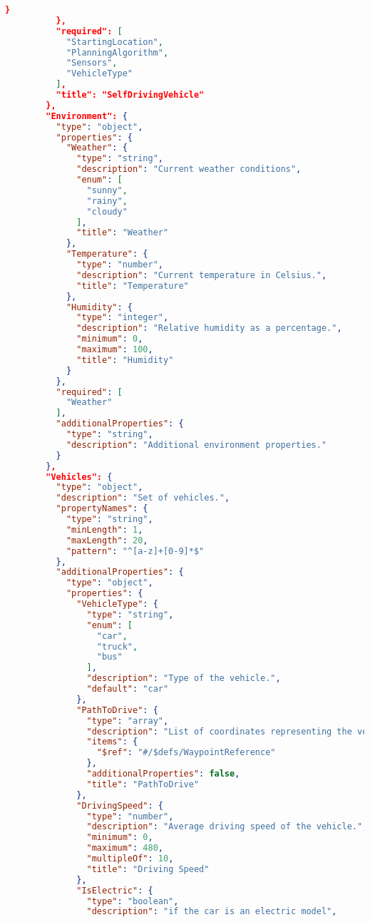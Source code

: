 \begin{lstlisting}[language=json,firstnumber=1]
            }
          },
          "required": [
            "StartingLocation",
            "PlanningAlgorithm",
            "Sensors",
            "VehicleType"
          ],
          "title": "SelfDrivingVehicle"
        },
        "Environment": {
          "type": "object",
          "properties": {
            "Weather": {
              "type": "string",
              "description": "Current weather conditions",
              "enum": [
                "sunny",
                "rainy",
                "cloudy"
              ],
              "title": "Weather"
            },
            "Temperature": {
              "type": "number",
              "description": "Current temperature in Celsius.",
              "title": "Temperature"
            },
            "Humidity": {
              "type": "integer",
              "description": "Relative humidity as a percentage.",
              "minimum": 0,
              "maximum": 100,
              "title": "Humidity"
            }
          },
          "required": [
            "Weather"
          ],
          "additionalProperties": {
            "type": "string",
            "description": "Additional environment properties."
          }
        },
        "Vehicles": {
          "type": "object",
          "description": "Set of vehicles.",
          "propertyNames": {
            "type": "string",
            "minLength": 1,
            "maxLength": 20,
            "pattern": "^[a-z]+[0-9]*$"
          },
          "additionalProperties": {
            "type": "object",
            "properties": {
              "VehicleType": {
                "type": "string",
                "enum": [
                  "car",
                  "truck",
                  "bus"
                ],
                "description": "Type of the vehicle.",
                "default": "car"
              },
              "PathToDrive": {
                "type": "array",
                "description": "List of coordinates representing the vehicle's path.",
                "items": {
                  "$ref": "#/$defs/WaypointReference"
                },
                "additionalProperties": false,
                "title": "PathToDrive"
              },
              "DrivingSpeed": {
                "type": "number",
                "description": "Average driving speed of the vehicle.",
                "minimum": 0,
                "maximum": 480,
                "multipleOf": 10,
                "title": "Driving Speed"
              },
              "IsElectric": {
                "type": "boolean",
                "description": "if the car is an electric model",

\end{lstlisting}
